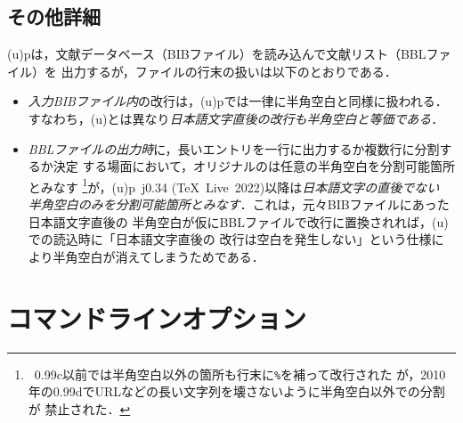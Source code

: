 \documentclass[a4paper,11pt,nomag,dvipdfmx]{jsarticle}
\def\code#1{\texttt{#1}}
\def\pBibTeX{p\kern-.05em\BibTeX}
\def\upBibTeX{u\pBibTeX}
\def\pBibTeX{p\BibTeX}%
\def\upBibTeX{u\pBibTeX}%
\def\TL{\TeX~Live}
\begin{document}
\subsection{その他詳細}\label{sec:jnewline}

(u)\pBibTeX は，文献データベース（BIBファイル）を読み込んで文献リスト（BBLファイル）を
出力するが，ファイルの行末の扱いは以下のとおりである．%
\begin{itemize}
 \item \emph{入力BIBファイル内}の改行は，(u)\pBibTeX では一律に半角空白と同様に扱われる．
   すなわち，(u)\pTeX とは異なり\emph{日本語文字直後の改行も半角空白と等価である}．
 \item \emph{BBLファイルの出力時}に，長いエントリを一行に出力するか複数行に分割するか決定
   する場面において，オリジナルの\BibTeX は任意の半角空白を分割可能箇所とみなす
   \footnote{\BibTeX~0.99c以前では半角空白以外の箇所も行末に\code{\%}を補って改行された
   が，2010年の0.99dでURLなどの長い文字列を壊さないように半角空白以外での分割が
   禁止された．}が，(u)\pBibTeX~j0.34 (\TL~2022)以降は\emph{日本語文字の直後でない
   半角空白のみを分割可能箇所とみなす}．これは，元々BIBファイルにあった日本語文字直後の
   半角空白が仮にBBLファイルで改行に置換されれば，(u)\pTeX での読込時に「日本語文字直後の
   改行は空白を発生しない」という仕様により半角空白が消えてしまうためである\cite{tjb132}．
\end{itemize}


\section{コマンドラインオプション}\label{sec:commandline_option}
\end{document}

